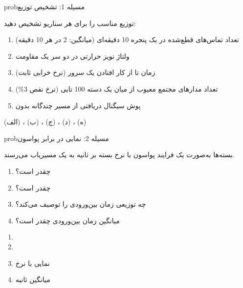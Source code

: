 
\begin{PSbox}[unbreakable]{prob}{مسیله 1: تشخیص توزیع}

توزیع مناسب را برای هر سناریو تشخیص دهید:

\begin{enumerate}
\def\labelenumi{(\PSalph{enumi})}
\tightlist
\item
  تعداد تماس‌های قطع‌شده در یک پنجره 10 دقیقه‌ای (میانگین: 2 در هر 10 دقیقه)
\item
  ولتاژ نویز حرارتی در دو سر یک مقاومت
\item
  زمان تا از کار افتادن یک سرور (نرخ خرابی ثابت)
\item
  تعداد مدارهای مجتمع معیوب از میان یک دسته 100 تایی (نرخ نقص 3\%)
\item
  پوش سیگنال دریافتی از مسیر چندگانه بدون 
\end{enumerate}

\PSsolution{} (الف) ، (ب) ، (ج) ، (د) ، (ه) 

\end{PSbox}

\begin{PSbox}[unbreakable]{prob}{مسیله 2: نمایی در برابر پواسون}

بسته‌ها به‌صورت یک فرایند پواسون با نرخ  بسته بر ثانیه به یک مسیریاب می‌رسند.

\begin{enumerate}
\def\labelenumi{(\PSalph{enumi})}
\tightlist
\item
   چقدر است؟
\item
   چقدر است؟
\item
  چه توزیعی زمان بین‌ورودی را توصیف می‌کند؟
\item
  میانگین زمان بین‌ورودی چقدر است؟
\end{enumerate}

\PSsolution{} 

\begin{enumerate}
\def\labelenumi{(\PSalph{enumi})}
\tightlist
\item
\item
\item
  نمایی با نرخ 
\item
  میانگین  ثانیه
\end{enumerate}

\end{PSbox}


